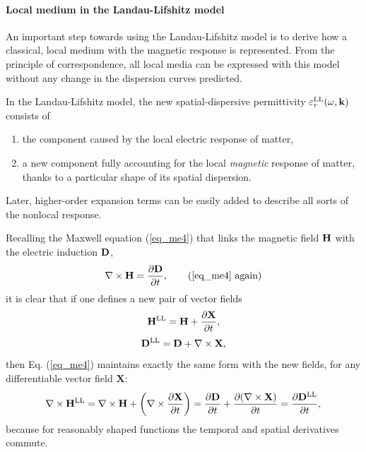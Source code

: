 \paragraph{Local medium in the Landau-Lifshitz model} %
An important step towards using the Landau-Lifshitz model is to derive how a classical, local medium with the magnetic response is represented. From the principle of correspondence, all local media can be expressed with this model without any change in the dispersion curves predicted. 

In the Landau-Lifshitz model, the new spatial-dispersive permittivity $\varepsilon_r^\text{LL}(\omega, {\mathbf{k}})$ consists of
\begin{enumerate}
 \item{the component caused by the local electric response of matter,} 
 \item{a new component fully accounting for the local \textit{magnetic} response of matter, thanks to a particular shape of its spatial dispersion.}
\end{enumerate}
Later, higher-order expansion terms can be easily added to describe all sorts of the nonlocal response.

Recalling the Maxwell equation (\ref{eq_me4}) that links the magnetic field $\mathbf{H}$ with the electric induction $\mathbf{D}$, 
\begin{equation} \nabla \times \HH =  \frac{\partial \D} {\partial t}, \tag{\ref{eq_me4} \again} \end{equation}
it is clear that if one defines a new pair of vector fields
\begin{equation} {\mathbf{H}^\text{LL}} = \mathbf{H} + \frac{\partial\mathbf{X}}{\partial t}, \label{eq_HHsd}\end{equation}
\begin{equation} {\mathbf{D}^\text{LL}}  = \mathbf{D}  + \nabla\times \mathbf{X}, \label{eq_Dsd}\end{equation}
then Eq. (\ref{eq_me4}) maintains exactly the same form with the new fields, for any differentiable vector field $\mathbf{X}$:
\begin{equation} \nabla \times {\mathbf{H}^\text{LL}} = \nabla \times \mathbf{H} + \left(\nabla\times \frac{\partial\mathbf{X}}{\partial t}\right) = \frac{\partial \mathbf{D}}{\partial t}+ \frac{\partial(\nabla\times \mathbf{X})}{\partial t} =  \frac{\partial {\mathbf{D}^\text{LL}}} {\partial t}, \label{eq_me4sd} \end{equation}
because for reasonably shaped functions the temporal and spatial derivatives commute.

